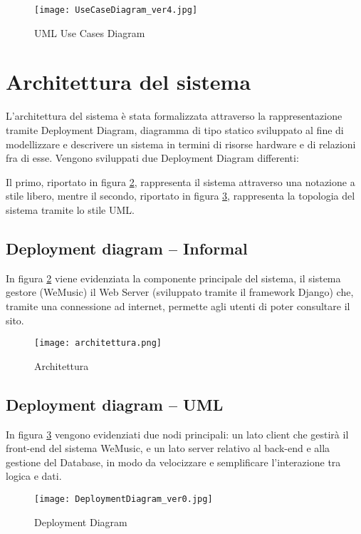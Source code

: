 \begin{figure}[H]
      \centering
      \texttt{[image: UseCaseDiagram\_ver4.jpg]}
      \caption{UML Use Cases Diagram}
      \label{fig-uml-use-cases}
\end{figure}


\newpage
\section{Architettura del sistema}
L'architettura del sistema è stata formalizzata attraverso la rappresentazione tramite Deployment Diagram, diagramma di tipo statico 
sviluppato al fine di modellizzare e descrivere un sistema in termini di risorse hardware e di relazioni fra di esse.
Vengono sviluppati due Deployment Diagram differenti:

Il primo, riportato in figura \ref{architettura}, rappresenta il sistema
attraverso una notazione a stile libero, mentre il secondo, riportato in figura \ref{dep_diagram}, rappresenta
la topologia del sistema tramite lo stile UML. 

\vspace{2cm}

\subsection{Deployment diagram -- Informal}
In figura \ref{architettura} viene evidenziata la componente principale del sistema, il sistema gestore (WeMusic)
il Web Server (sviluppato tramite il framework Django) che, tramite una connessione ad internet, permette 
agli utenti di poter consultare il sito.
\begin{figure}[H]
      \centering
      \texttt{[image: architettura.png]}
      \caption{Architettura}
      \label{architettura}
\end{figure}


\newpage
\subsection{Deployment diagram -- UML}
In figura \ref{dep_diagram} vengono evidenziati due nodi principali: 
un lato client che gestirà il front-end del sistema WeMusic, e un lato server relativo 
al back-end e alla gestione del Database, in modo da velocizzare e semplificare l'interazione tra logica e dati. 
\begin{figure}[H]
    \centering
    \texttt{[image: DeploymentDiagram\_ver0.jpg]}
    \caption{Deployment Diagram}
    \label{dep_diagram}
\end{figure}


